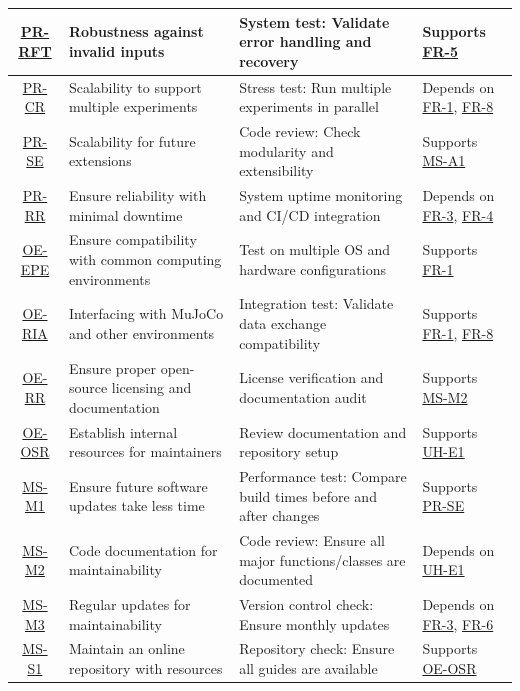 \documentclass[12pt]{article}
\begin{document}
\begin{landscape}
\begin{longtable}{|c|p{6cm}|p{5cm}|p{4cm}|}
    \hline
    \hyperref[PR-RFT]{PR-RFT} & Robustness against invalid inputs & System test: Validate error handling and recovery & Supports \hyperref[FR-5]{FR-5} \\
    \hline
    \hyperref[PR-CR]{PR-CR} & Scalability to support multiple experiments & Stress test: Run multiple experiments in parallel & Depends on \hyperref[FR-1]{FR-1}, \hyperref[FR-8]{FR-8} \\
    \hline
    \hyperref[PR-SE]{PR-SE} & Scalability for future extensions & Code review: Check modularity and extensibility & Supports \hyperref[MS-A1]{MS-A1} \\
    \hline
    \hyperref[PR-RR]{PR-RR} & Ensure reliability with minimal downtime & System uptime monitoring and CI/CD integration & Depends on \hyperref[FR-3]{FR-3}, \hyperref[FR-4]{FR-4} \\
    \hline
    \hyperref[OE-EPE]{OE-EPE} & Ensure compatibility with common computing environments & Test on multiple OS and hardware configurations & Supports \hyperref[FR-1]{FR-1} \\
    \hline
    \hyperref[OE-RIA]{OE-RIA} & Interfacing with MuJoCo and other environments & Integration test: Validate data exchange compatibility & Supports \hyperref[FR-1]{FR-1}, \hyperref[FR-8]{FR-8} \\
    \hline
    \hyperref[OE-RR]{OE-RR} & Ensure proper open-source licensing and documentation & License verification and documentation audit & Supports \hyperref[MS-M2]{MS-M2} \\
    \hline
    \hyperref[OE-OSR]{OE-OSR} & Establish internal resources for maintainers & Review documentation and repository setup & Supports \hyperref[UH-E1]{UH-E1} \\
    \hline
    \hyperref[MS-M1]{MS-M1} & Ensure future software updates take less time & Performance test: Compare build times before and after changes & Supports \hyperref[PR-SE]{PR-SE} \\
    \hline
    \hyperref[MS-M2]{MS-M2} & Code documentation for maintainability & Code review: Ensure all major functions/classes are documented & Depends on \hyperref[UH-E1]{UH-E1} \\
    \hline
    \hyperref[MS-M3]{MS-M3} & Regular updates for maintainability & Version control check: Ensure monthly updates & Depends on \hyperref[FR-3]{FR-3}, \hyperref[FR-6]{FR-6} \\
    \hline
    \hyperref[MS-S1]{MS-S1} & Maintain an online repository with resources & Repository check: Ensure all guides are available & Supports \hyperref[OE-OSR]{OE-OSR} \\

\end{longtable}
\end{landscape}
\end{document}
